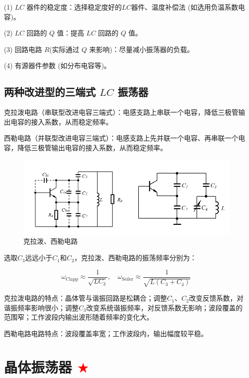 (1) $LC$ 器件的稳定度：选择稳定度好的$LC$器件、温度补偿法 (如选用负温系数电容)。

(2) $LC$ 回路的 $Q$ 值：提高 $LC$ 回路的 $Q$ 值。

(3) 回路电路 $R$(实际通过 $Q$ 来影响)：尽量减小振荡器的负载。

(4) 有源器件参数 (如分布电容等)。

\subsection{两种改进型的三端式 $LC$ 振荡器}

克拉泼电路（串联型改进电容三端式）：电感支路上串联一个电容，降低三极管输出电容的接入系数，从而稳定频率。

西勒电路（并联型改进电容三端式）：电感支路上先并联一个电容、再串联一个电容，降低三极管输出电容的接入系数，从而稳定频率。

\begin{figure}[htbp]
    \centering
    \includegraphics[scale=0.7]{image/Picture8.png}
    \caption{克拉泼、西勒电路}
\end{figure}

选取$C_3$远远小于$C_1$和$C_2$，克拉泼、西勒电路的振荡频率分别为：

\begin{equation}
    \omega_{\text{Clapp}} \approx \frac{1}{\sqrt{L C_3}}, \quad 
    \omega_{\text{Seiler}} \approx \frac{1}{\sqrt{L (C_3 + C_4)}}
\end{equation}

克拉泼电路的特点：晶体管与谐振回路是松耦合；调整$C_1$、$C_2$改变反馈系数，对谐振频率影响很小；调整$C_3$改变系统谐振频率，对反馈系数无影响；波段覆盖的范围窄；工作波段内输出波形随着频率的变化大。

西勒电路电路特点：波段覆盖率宽；工作波段内，输出幅度较平稳。

\section{晶体振荡器 \textcolor{red}{$\bigstar$}}

